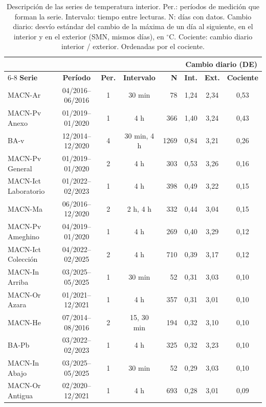 \documentclass[11pt,a4paper]{article}
\begin{document}
\begin{table}[htbp]
\centering
\footnotesize
\setlength{\tabcolsep}{3.5pt}
\caption{Descripción de las series de temperatura interior. Per.: períodos de medición que forman la serie. Intervalo: tiempo entre lecturas. N: días con datos. Cambio diario: desvío estándar del cambio de la máxima de un día al siguiente, en el interior y en el exterior (SMN, mismos días), en $^\circ$C. Cociente: cambio diario interior / exterior. Ordenadas por el cociente.}
\label{tab:exploratorio}
\begin{tabular}{l c c c r c c c}
\toprule
 & & & & & \multicolumn{3}{c}{\textbf{Cambio diario (DE)}} \\
\cmidrule(lr){6-8}
\textbf{Serie} & \textbf{Período} & \textbf{Per.} & \textbf{Intervalo} & \textbf{N} & \textbf{Int.} & \textbf{Ext.} & \textbf{Cociente} \\
\midrule
MACN-Ar                & 04/2016--06/2016 & 1 & 30 min & 78 & 1{,}24 & 2{,}34 & 0{,}53 \\
MACN-Pv Anexo          & 01/2019--01/2020 & 1 & 4 h & 366 & 1{,}40 & 3{,}24 & 0{,}43 \\
BA-v                   & 12/2014--12/2020 & 4 & 30 min, 4 h & 1269 & 0{,}84 & 3{,}21 & 0{,}26 \\
MACN-Pv General        & 01/2019--01/2020 & 2 & 4 h & 303 & 0{,}53 & 3{,}26 & 0{,}16 \\
MACN-Ict Laboratorio   & 01/2022--02/2023 & 1 & 4 h & 398 & 0{,}49 & 3{,}22 & 0{,}15 \\
MACN-Ma                & 06/2016--12/2020 & 2 & 2 h, 4 h & 332 & 0{,}44 & 3{,}04 & 0{,}15 \\
MACN-Pv Ameghino       & 04/2019--01/2020 & 1 & 4 h & 269 & 0{,}40 & 3{,}29 & 0{,}12 \\
MACN-Ict Colección     & 04/2022--02/2025 & 2 & 4 h & 710 & 0{,}39 & 3{,}17 & 0{,}12 \\
MACN-In Arriba         & 03/2025--05/2025 & 1 & 30 min & 52 & 0{,}31 & 3{,}03 & 0{,}10 \\
MACN-Or Azara          & 01/2021--12/2021 & 1 & 4 h & 357 & 0{,}31 & 3{,}01 & 0{,}10 \\
MACN-He                & 07/2014--08/2016 & 2 & 15, 30 min & 194 & 0{,}32 & 3{,}10 & 0{,}10 \\
BA-Pb                  & 03/2022--02/2023 & 1 & 4 h & 325 & 0{,}32 & 3{,}23 & 0{,}10 \\
MACN-In Abajo          & 03/2025--05/2025 & 1 & 30 min & 52 & 0{,}29 & 3{,}03 & 0{,}10 \\
MACN-Or Antigua        & 02/2020--12/2021 & 1 & 4 h & 693 & 0{,}28 & 3{,}01 & 0{,}09 \\
\bottomrule
\end{tabular}
\end{table}
\end{document}
